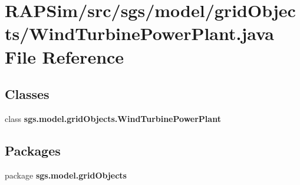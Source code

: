 \section{R\-A\-P\-Sim/src/sgs/model/grid\-Objects/\-Wind\-Turbine\-Power\-Plant.java File Reference}
\label{_wind_turbine_power_plant_8java}
\subsection*{Classes}
\begin{DoxyCompactItemize}
\item 
class {\bf sgs.\-model.\-grid\-Objects.\-Wind\-Turbine\-Power\-Plant}
\end{DoxyCompactItemize}
\subsection*{Packages}
\begin{DoxyCompactItemize}
\item 
package {\bf sgs.\-model.\-grid\-Objects}
\end{DoxyCompactItemize}
